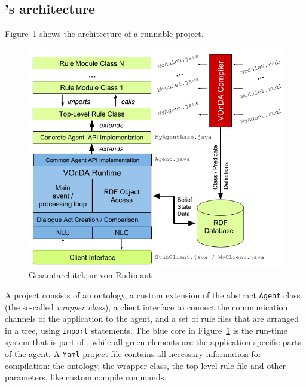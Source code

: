 \subsection{\vonda's architecture}

Figure~\ref{fig:architecture} shows the architecture of a runnable \vonda project.


\begin{figure}[htbp]
  \centering
  \includegraphics[width=.8\textwidth]{VOnDAStructureRot2.png}
  \caption{Gesamtarchitektur von Rudimant}
  \label{fig:architecture}
\end{figure}


A \vonda project consists of an ontology, a custom extension of the abstract
\texttt{Agent} class (the so-called \emph{wrapper class}), a client interface
to connect the communication channels of the application to the agent, and a
set of rule files that are arranged in a tree, using \texttt{import}
statements. The blue core in Figure~\ref{fig:architecture} is the run-time system that
is part of \vonda, while all green elements are the application specific parts
of the agent. A \texttt{Yaml} project file contains all necessary information
for compilation: the ontology, the wrapper class, the top-level rule file and
other parameters, like custom compile commands.

